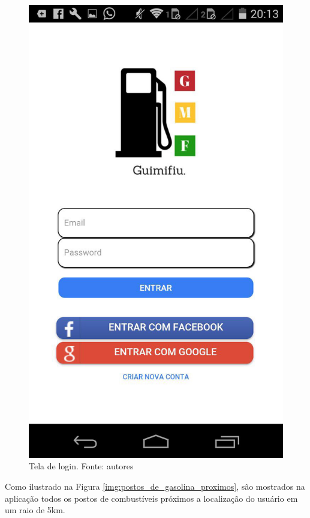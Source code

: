 \begin{figure}[H]
    \centering
    \includegraphics[scale=0.2]{figuras/app_1.jpg}
    \caption[Tela de login]{Tela de login. Fonte: autores}
    \label{img:tela_de_login}
\end{figure}
\pagebreak

Como ilustrado na Figura \ref{img:postos_de_gasolina_proximos}, são mostrados na aplicação todos os postos de combustíveis próximos a localização do usuário em um raio de 5km.

